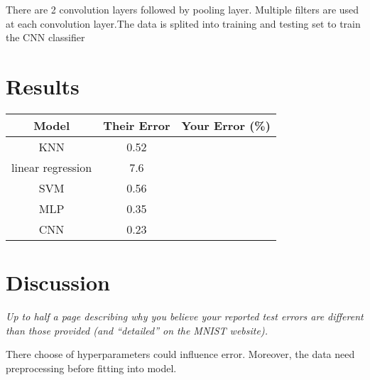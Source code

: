 \documentclass{article}
\def\gre#1{{\color{gre}#1}}
\begin{document}
\gre{There are 2 convolution layers followed by pooling layer. Multiple filters are used at each convolution layer.The data is splited into training and testing set to train the CNN classifier}


\section{Results}
\begin{center}
 \begin{tabular}{|c | c | c|} 
 \hline
 Model & Their Error & Your Error (\%) \\ [0.5ex]
 \hline\hline
 KNN & 0.52 & \\
 linear regression & 7.6 & \\
 SVM & 0.56 & \\
 MLP & 0.35 & \\
 CNN & 0.23 & \\ 
 \hline
\end{tabular}
\end{center}

\section{Discussion}
\emph{Up to half a page describing why you believe your reported test errors are different than those provided (and ``detailed'' on the MNIST website).}

\gre{There choose of hyperparameters could influence error. Moreover, the data need preprocessing before fitting into model.
}
\end{document}
